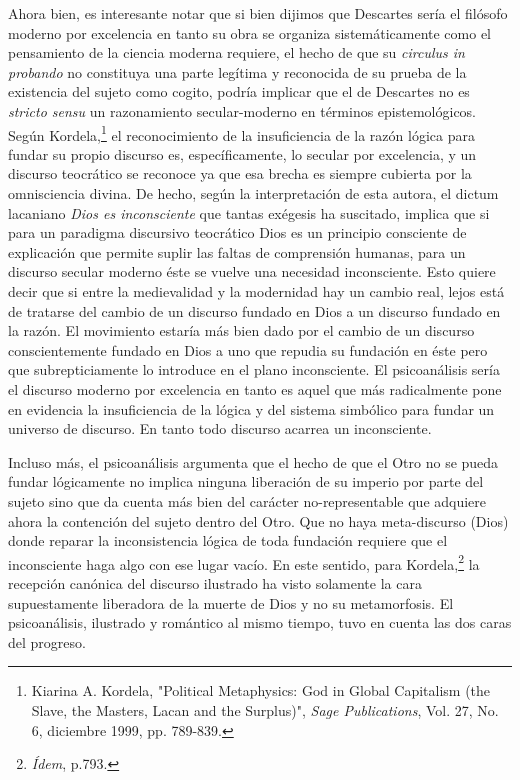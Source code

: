 Ahora bien, es interesante notar que si bien dijimos que Descartes sería
el filósofo moderno por excelencia en tanto su obra se organiza
sistemáticamente como el pensamiento de la ciencia moderna requiere, el
hecho de que su \emph{circulus in probando} no constituya una parte
legítima y reconocida de su prueba de la existencia del sujeto como
cogito, podría implicar que el de Descartes no es \emph{stricto sensu}
un razonamiento secular-moderno en términos epistemológicos. Según
Kordela,\footnote{Kiarina A. Kordela, "Political Metaphysics: God in
  Global Capitalism (the Slave, the Masters, Lacan and the Surplus)",
  \emph{Sage Publications}, Vol. 27, No. 6, diciembre 1999, pp. 789-839.}
el reconocimiento de la insuficiencia de la razón lógica para fundar su
propio discurso es, específicamente, lo secular por excelencia, y un
discurso teocrático se reconoce ya que esa brecha es siempre cubierta
por la omnisciencia divina. De hecho, según la interpretación de esta
autora, el dictum lacaniano \emph{Dios es inconsciente} que tantas
exégesis ha suscitado, implica que si para un paradigma discursivo
teocrático Dios es un principio consciente de explicación que permite
suplir las faltas de comprensión humanas, para un discurso secular
moderno éste se vuelve una necesidad inconsciente. Esto quiere decir que
si entre la medievalidad y la modernidad hay un cambio real, lejos está
de tratarse del cambio de un discurso fundado en Dios a un discurso
fundado en la razón. El movimiento estaría más bien dado por el cambio
de un discurso conscientemente fundado en Dios a uno que repudia su
fundación en éste pero que subrepticiamente lo introduce en el plano
inconsciente. El psicoanálisis sería el discurso moderno por excelencia
en tanto es aquel que más radicalmente pone en evidencia la
insuficiencia de la lógica y del sistema simbólico para fundar un
universo de discurso. En tanto todo discurso acarrea un inconsciente.

Incluso más, el psicoanálisis argumenta que el hecho de que el Otro no
se pueda fundar lógicamente no implica ninguna liberación de su imperio
por parte del sujeto sino que da cuenta más bien del carácter
no-representable que adquiere ahora la contención del sujeto dentro del
Otro. Que no haya meta-discurso (Dios) donde reparar la inconsistencia
lógica de toda fundación requiere que el inconsciente haga algo con ese
lugar vacío. En este sentido, para Kordela,\footnote{\emph{Ídem}, p.793.}
la recepción canónica del discurso ilustrado ha visto solamente la cara
supuestamente liberadora de la muerte de Dios y no su metamorfosis. El
psicoanálisis, ilustrado y romántico al mismo tiempo, tuvo en cuenta las
dos caras del progreso.

